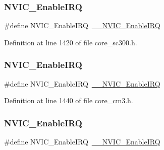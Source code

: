 \subsubsection{\texorpdfstring{N\+V\+I\+C\+\_\+\+Enable\+I\+RQ}{NVIC\_EnableIRQ}\hspace{0.1cm}{\footnotesize\ttfamily [7/13]}}
{\footnotesize\ttfamily \#define N\+V\+I\+C\+\_\+\+Enable\+I\+RQ~\hyperlink{group___c_m_s_i_s___core___n_v_i_c_functions_ga71227e1376cde11eda03fcb62f1b33ea}{\+\_\+\+\_\+\+N\+V\+I\+C\+\_\+\+Enable\+I\+RQ}}



Definition at line 1420 of file core\+\_\+sc300.\+h.

\mbox{\label{group___c_m_s_i_s___core___n_v_i_c_functions_ga57b3064413dbc7459d9646020fdd8bef}} 
\subsubsection{\texorpdfstring{N\+V\+I\+C\+\_\+\+Enable\+I\+RQ}{NVIC\_EnableIRQ}\hspace{0.1cm}{\footnotesize\ttfamily [8/13]}}
{\footnotesize\ttfamily \#define N\+V\+I\+C\+\_\+\+Enable\+I\+RQ~\hyperlink{group___c_m_s_i_s___core___n_v_i_c_functions_ga71227e1376cde11eda03fcb62f1b33ea}{\+\_\+\+\_\+\+N\+V\+I\+C\+\_\+\+Enable\+I\+RQ}}



Definition at line 1440 of file core\+\_\+cm3.\+h.

\mbox{\label{group___c_m_s_i_s___core___n_v_i_c_functions_ga57b3064413dbc7459d9646020fdd8bef}} 
\subsubsection{\texorpdfstring{N\+V\+I\+C\+\_\+\+Enable\+I\+RQ}{NVIC\_EnableIRQ}\hspace{0.1cm}{\footnotesize\ttfamily [9/13]}}
{\footnotesize\ttfamily \#define N\+V\+I\+C\+\_\+\+Enable\+I\+RQ~\hyperlink{group___c_m_s_i_s___core___n_v_i_c_functions_ga71227e1376cde11eda03fcb62f1b33ea}{\+\_\+\+\_\+\+N\+V\+I\+C\+\_\+\+Enable\+I\+RQ}}



